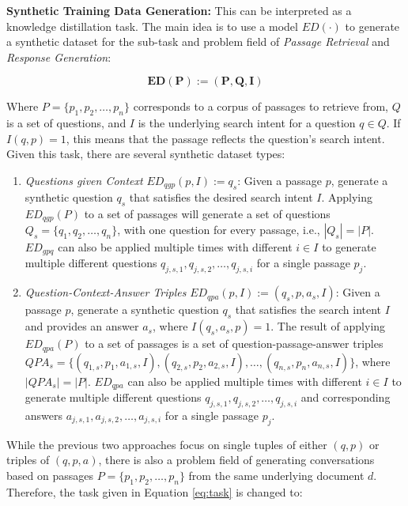 \vspace{\baselineskip} %
\noindent\textbf{Synthetic Training Data Generation:} This can be interpreted as a knowledge distillation task. The main idea is to use a model $ED(\cdot)$ to generate a synthetic dataset for the sub-task and problem field of \textit{Passage Retrieval} and \textit{Response Generation}:

\begin{equation}
    \mathbf{ED(P) := (P, Q, I)}
    \label{eq:task}
\end{equation}

Where $P = \{p_1, p_2, \dots, p_n\}$ corresponds to a corpus of passages to retrieve from, $Q$ is a set of questions, and $I$ is the underlying search intent for a question $q \in Q$. If $I(q,p) = 1$, this means that the passage reflects the question's search intent. Given this task, there are several synthetic dataset types:

\begin{enumerate}
    \item \textit{Questions given Context} $ED_{qgp}(p,I) := q_s$: Given a passage $p$, generate a synthetic question $q_s$ that satisfies the desired search intent $I$. Applying $ED_{qgp}(P)$ to a set of passages will generate a set of questions $Q_s = \{q_1, q_2, \dots, q_n\}$, with one question for every passage, i.e., $|Q_s| = |P|$. $ED_{gpq}$ can also be applied multiple times with different $i \in I$ to generate multiple different questions $q_{j,s,1}, q_{j,s,2}, \dots , q_{j,s,i}$ for a single passage $p_j$.
    \item \textit{Question-Context-Answer Triples} $ED_{qpa}(p, I) := (q_s, p, a_s, I)$: Given a passage $p$, generate a synthetic question $q_s$ that satisfies the search intent $I$ and provides an answer $a_s$, where $I(q_s, a_s, p) = 1$. The result of applying $ED_{qpa}(P)$ to a set of passages is a set of question-passage-answer triples $QPA_s = \allowbreak \{(q_{1,s}, p_1, a_{1,s}, I), \allowbreak (q_{2,s}, p_2, a_{2,s}, I), \allowbreak \dots, (q_{n,s}, p_n, a_{n,s}, I)\}$, where $|QPA_s| = |P|$. $ED_{qpa}$ can also be applied multiple times with different $i \in I$ to generate multiple different questions $q_{j,s,1}, \allowbreak q_{j,s,2}, \dots , q_{j,s,i}$ and corresponding answers $a_{j,s,1}, \allowbreak a_{j,s,2}, \dots , a_{j,s,i}$ for a single passage $p_j$.
\end{enumerate}

While the previous two approaches focus on single tuples of either $(q,p)$ or triples of $(q,p,a)$, there is also a problem field of generating conversations based on passages $P = \{p_1, p_2, \dots, p_n\}$ from the same underlying document $d$. Therefore, the task given in Equation \ref{eq:task} is changed to:

